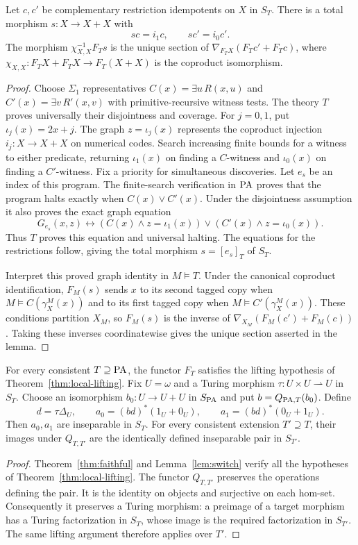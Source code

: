 \begin{lemma}\label{lem:switch}
Let $c,c'$ be complementary restriction idempotents on $X$ in $S_T$.
There is a total morphism $s:X\to X+X$ with
\[
 sc=i_1c,\qquad sc'=i_0c'.
\]
The morphism $\chi_{X,X}^{-1}F_Ts$ is the unique section of
$\nabla_{F_TX}(F_Tc'+F_Tc)$, where
$\chi_{X,X}:F_TX+F_TX\to F_T(X+X)$ is the coproduct isomorphism.
\end{lemma}
\begin{proof}
Choose $\Sigma_1$ representatives $C(x)=\exists u\,R(x,u)$ and
$C'(x)=\exists v\,R'(x,v)$ with primitive-recursive witness tests.
The theory $T$ proves universally their disjointness and coverage.
For $j=0,1$, put $\iota_j(x)=2x+j$. The graph
$z=\iota_j(x)$ represents the coproduct injection
$i_j:X\to X+X$ on numerical codes.
Search increasing finite bounds for a witness to either predicate,
returning $\iota_1(x)$ on finding a $C$-witness and $\iota_0(x)$
on finding a $C'$-witness. Fix a priority for simultaneous discoveries.
Let $e_s$ be an index of this program. The finite-search verification
in $\mathrm{PA}$ proves that the program halts
exactly when $C(x)\lor C'(x)$. Under the disjointness assumption it also
proves the exact graph equation
\[
 G_{e_s}(x,z)\leftrightarrow
 (C(x)\land z=\iota_1(x))\lor(C'(x)\land z=\iota_0(x)).
\]
Thus $T$ proves this equation and universal halting. The equations for
the restrictions follow, giving the total morphism $s=[e_s]_T$ of $S_T$.

Interpret this proved graph identity in $M\models T$.
Under the canonical coproduct identification, $F_M(s)$ sends
$x$ to its second tagged copy when
$M\models C(\gamma_X^M(x))$ and to its first tagged copy when
$M\models C'(\gamma_X^M(x))$.
These conditions partition $X_M$, so $F_M(s)$ is the inverse of
$\nabla_{X_M}(F_M(c')+F_M(c))$.
Taking these inverses coordinatewise gives the unique section
asserted in the lemma.
\end{proof}

\begin{corollary}\label{cor:pair}
For every consistent $T\supseteq\mathrm{PA}$, the functor $F_T$ satisfies the
lifting hypothesis of Theorem~\ref{thm:local-lifting}.
Fix $U=\omega$ and a Turing morphism
$\tau:U\times U\rightharpoonup U$ in $S_T$.
Choose an isomorphism $b_0:U\to U+U$ in $S_{\mathrm{PA}}$ and put
$b=Q_{\mathrm{PA},T}(b_0)$. Define
\[
 d=\tau\Delta_U,\qquad
 a_0=(bd)^*(1_U+0_U),\qquad a_1=(bd)^*(0_U+1_U).
\]
Then $a_0,a_1$ are inseparable in $S_T$. For every consistent
extension $T'\supseteq T$, their images under $Q_{T,T'}$ are the
identically defined inseparable pair in $S_{T'}$.
\end{corollary}
\begin{proof}
Theorem~\ref{thm:faithful} and Lemma~\ref{lem:switch} verify all the
hypotheses of Theorem~\ref{thm:local-lifting}.
The functor $Q_{T,T'}$ preserves the operations defining the pair.
It is the identity on objects and surjective on each hom-set.
Consequently it preserves a Turing morphism: a preimage of a
target morphism has a Turing factorization in $S_T$, whose image is
the required factorization in $S_{T'}$.
The same lifting argument therefore applies over $T'$.
\end{proof}

